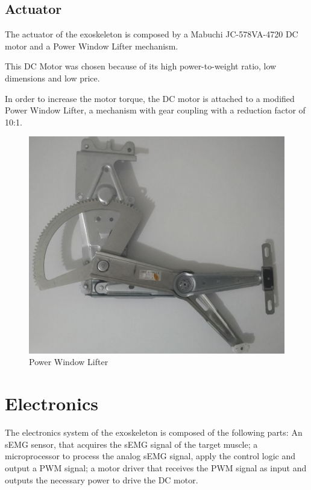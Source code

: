   \subsection{Actuator}
   
   The actuator of the exoskeleton is composed by a Mabuchi JC-578VA-4720 DC motor and a Power Window Lifter mechanism.
   
   This DC Motor was chosen because of its high power-to-weight ratio, low dimensions and low price.
   
   In order to increase the motor torque, the DC motor is attached to a modified Power Window Lifter, a mechanism with gear coupling with a reduction factor of 10:1.
   
   \begin{figure}[thpb]
      \centering
      \includegraphics[scale=0.5]{Images/PowerWindowLifter.jpg}
      \caption{Power Window Lifter \cite{Sommer2015}}
      \label{PowerWindowLifter}
   \end{figure}
   
   \section{Electronics}
   
   The electronics system of the exoskeleton is composed of the following parts: An sEMG sensor, that acquires the sEMG signal of the target muscle; a microprocessor to process the analog sEMG signal, apply the control logic and output a PWM signal; a motor driver that receives the PWM signal as input and outputs the necessary power to drive the DC motor.
   
